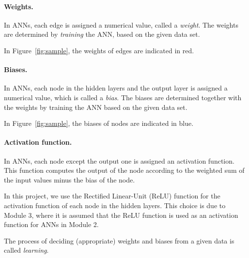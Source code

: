 \documentclass[11pt,titlepage,dvipdfmx,twoside]{book}
\newcommand{\figref}[1]{Figure~\ref{fig:#1}}
\begin{document}
\paragraph{Weights.}
In ANNs, each edge is assigned a numerical value, called a {\em weight}.
The weights are determined by \emph{training} the ANN, 
based on the given data set. 

In \figref{sample}, the weights of edges are indicated in red. 


\paragraph{Biases.}
In ANNs, each node in the hidden layers and the output layer
is assigned a numerical value, which is called a {\em bias}.
The biases are determined together 
with the weights by training the ANN based on the given data set. 

In \figref{sample}, the biases of nodes are indicated in blue. 



\paragraph{Activation function.}
In ANNs, each node except the output one is assigned an activation function.
This function computes the output of the node
according to the weighted sum of the input values minus the bias of the node.

In this project, we use the Rectified Linear-Unit (ReLU) function
for the activation function of each node in the hidden layers.
This choice is due to Module 3, 
where it is assumed that the ReLU function is used
as an activation function for ANNs in Module 2.

\medskip

The process of deciding (appropriate) weights and biases
from a given data is called {\em learning}.
\end{document}
